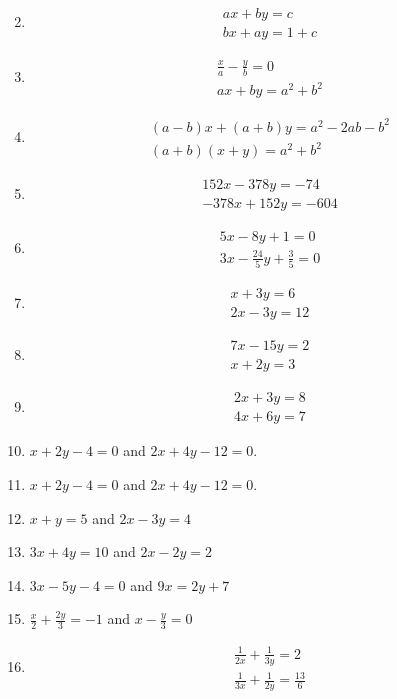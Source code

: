 \begin{enumerate}[label=\thesubsection.\arabic*,ref=\thesubsection.\theenumi]
\begin{align}
\end{align}
\item
\begin{align}                                                   
ax+by=c\\ bx+ay=1+c
\end{align}
\item 
\begin{align}
\frac {x}{a}-\frac{y}{b}=0\\ ax+by=a^2+b^2
\end{align}
\item
\begin{align}
(a-b)x+(a+b)y=a^2-2ab-b^2\\ (a+b)(x+y)=a^2+b^2
\end{align}
\item
\begin{align}
152x-378y=-74\\ -378x+152y=-604
\end{align}
\item
	\begin{align}
5x-8y+1 = 0 \\ 3x-\frac{24}{5}y+\frac{3}{5} = 0
\end{align}
\item 
	\begin{align}
x+3y = 6 \\  2x-3y = 12
\end{align}
\item 
	\begin{align}
7x-15y = 2 \\  x+2y = 3
\end{align}
\item 
\begin{align}
2x+3y = 8 \\ 4x+6y = 7
\end{align}
\item $x+2y-4=0$ and $2x+4y-12=0$.
\item $x+2y-4=0$ and $2x+4y-12=0$.
\item $x+y=5$ and $2x-3y=4$
\item $3x+4y=10$ and $ 2x-2y=2$
\item $3x-5y-4=0$ and $9x=2y+7$
\item $\frac{x}{2}+\frac{2y}{3}=-1$ and $x-\frac{y}{3}=0$
\item
\begin{align}
\frac{1}{2x}+\frac{1}{3y}=2 \\ \frac{1}{3x}+\frac{1}{2y}=\frac{13}{6}
\end{align}

\end{enumerate}
